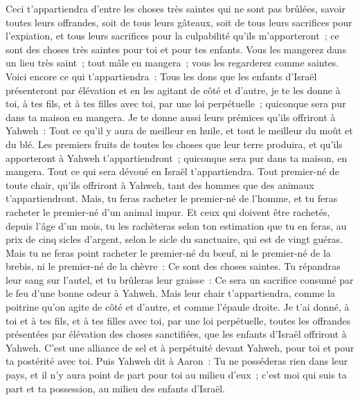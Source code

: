 \begin{multicols}{2}
Ceci t'appartiendra d'entre les choses très saintes qui ne sont pas brûlées, savoir toutes leurs offrandes, soit de tous leurs gâteaux, soit de tous leurs sacrifices pour l'expiation, et tous leurs sacrifices pour la culpabilité qu'ils m'apporteront~; ce sont des choses très saintes pour toi et pour tes enfants.
Vous les mangerez dans un lieu très saint~; tout mâle en mangera~; vous les regarderez comme saintes.
Voici encore ce qui t'appartiendra~: Tous les dons que les enfants d'Israël présenteront par élévation et en les agitant de côté et d'autre, je te les donne à toi, à tes fils, et à tes filles avec toi, par une loi perpétuelle~; quiconque sera pur dans ta maison en mangera.
Je te donne aussi leurs prémices qu'ils offriront à Yahweh~: Tout ce qu'il y aura de meilleur en huile, et tout le meilleur du moût et du blé.
Les premiers fruits de toutes les choses que leur terre produira, et qu'ils apporteront à Yahweh t'appartiendront~; quiconque sera pur dans ta maison, en mangera.
Tout ce qui sera dévoué en Israël t'appartiendra.
Tout premier-né de toute chair, qu'ils offriront à Yahweh, tant des hommes que des animaux t'appartiendront. Mais, tu feras racheter le premier-né de l'homme, et tu feras racheter le premier-né d'un animal impur.
Et ceux qui doivent être rachetés, depuis l'âge d'un mois, tu les rachèteras selon ton estimation que tu en feras, au prix de cinq sicles d'argent, selon le sicle du sanctuaire, qui est de vingt guéras.
Mais tu ne feras point racheter le premier-né du bœuf, ni le premier-né de la brebis, ni le premier-né de la chèvre~: Ce sont des choses saintes. Tu répandras leur sang sur l'autel, et tu brûleras leur graisse~: Ce sera un sacrifice consumé par le feu d'une bonne odeur à Yahweh.
Mais leur chair t'appartiendra, comme la poitrine qu'on agite de côté et d'autre, et comme l'épaule droite.
Je t'ai donné, à toi et à tes fils, et à tes filles avec toi, par une loi perpétuelle, toutes les offrandes présentées par élévation des choses sanctifiées, que les enfants d'Israël offriront à Yahweh. C'est une alliance de sel et à perpétuité devant Yahweh, pour toi et pour ta postérité avec toi.
Puis Yahweh dit à Aaron~: Tu ne posséderas rien dans leur pays, et il n'y aura point de part pour toi au milieu d'eux~; c'est moi qui suis ta part et ta possession, au milieu des enfants d'Israël.

\end{multicols}
